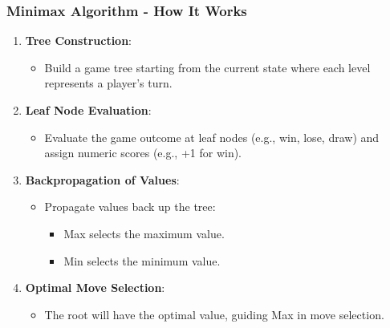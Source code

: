 \documentclass[aspectratio=169]{beamer}
\begin{document}
\begin{frame}[fragile]
    \frametitle{Minimax Algorithm - How It Works}
    \begin{enumerate}
        \item \textbf{Tree Construction}:
        \begin{itemize}
            \item Build a game tree starting from the current state where each level represents a player’s turn.
        \end{itemize}
        
        \item \textbf{Leaf Node Evaluation}:
        \begin{itemize}
            \item Evaluate the game outcome at leaf nodes (e.g., win, lose, draw) and assign numeric scores (e.g., +1 for win).
        \end{itemize}
        
        \item \textbf{Backpropagation of Values}:
        \begin{itemize}
            \item Propagate values back up the tree:
            \begin{itemize}
                \item Max selects the maximum value.
                \item Min selects the minimum value.
            \end{itemize}
        \end{itemize}
        
        \item \textbf{Optimal Move Selection}:
        \begin{itemize}
            \item The root will have the optimal value, guiding Max in move selection.
        \end{itemize}
    \end{enumerate}
\end{frame}
\end{document}
